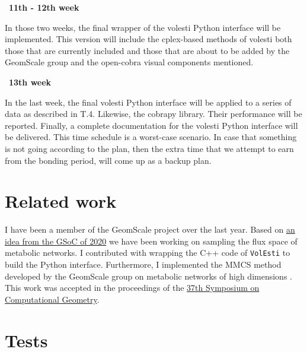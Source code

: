 \documentclass{article}
\begin{document}
\textbullet\ \textbf{11th - 12th week}

In those two weeks, the final wrapper of the volesti Python interface will be implemented. This version will include the cplex-based methods of volesti both those that are currently included and those that are about to be added by the GeomScale group and the open-cobra visual components mentioned. 


\textbullet\ \textbf{13th week}

In the last week, the final  volesti Python interface will be applied to a series of data as described in T.4. Likewise, the cobrapy library. Their performance will be reported. Finally, a complete documentation for the volesti Python interface will be delivered.
This time schedule is a worst-case scenario. In case that something is not going according to the plan, then the extra time that we attempt to earn from the bonding period, will come up as a backup plan.













\section{Related work}

I have been a member of the GeomScale project over the last year.
Based on \href{https://github.com/GeomScale/gsoc2020/wiki/High-dimensional-sampling-with-applications-to-structural-biology}{an idea from the GSoC of 2020} we have been working on sampling the flux space of metabolic networks. 
I contributed with wrapping the C++ code of \texttt{VolEsti} to build the Python interface.
Furthermore, I implemented the MMCS method developed by the GeomScale group on metabolic networks of high dimensions \cite{chalkis2020geometric}. 
This work was accepted in the proceedings of the \href{https://cse.buffalo.edu/socg21/accepted.html}{37th Symposium on Computational Geometry}.



\section{Tests}


\end{document}
